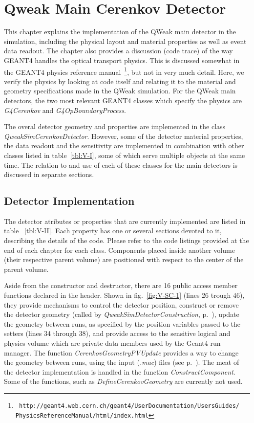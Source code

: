 \chapter{Qweak Main Cerenkov Detector}\label{CHP_V}

This chapter explains the implementation of the QWeak main detector in
the simulation, including the physical layout and material properties
as well as event data readout.  The chapter also provides a discussion
(code trace) of the way GEANT4 handles the optical transport
physics. This is discussed somewhat in the GEANT4 physics reference
manual~\cite{tn:GEANT4PRM}\footnote{{\tt
http://geant4.web.cern.ch/geant4/UserDocumentation/UsersGuides/\\PhysicsReferenceManual/html/index.html}},
but not in very much detail. Here, we verify the physics by looking at
code itself and relating it to the material and geometry
specifications made in the QWeak simulation. For the QWeak main
detectors, the two most relevant GEANT4 classes which specify the
physics are {\it G4Cerenkov} and {\it G4OpBoundaryProcess}.

The overal detector geometry and properties are implemented in the
class {\it QweakSimCerenkovDetector}. However, some of the detector
material properties, the data readout and the sensitivity are
implemented in combination with other classes listed in
table~\ref{tbl:V-I}, some of which serve multiple objects at the same
time.  The relation to and use of each of these classes for the main
detectors is discussed in separate sections.

\section{Detector Implementation}

The detector atributes or properties that are currently implemented
are listed in table ~\ref{tbl:V-II}. Each property has one or several
sections devoted to it, describing the details of the code.  Please
refer to the code listings provided at the end of each chapter for
each class. Components placed inside another volume (their respective
parent volume) are positioned with respect to the center of the parent
volume.

Aside from the constructor and destructor, there are 16 public access
member functions declared in the header.  Shown in
fig.~\ref{fig:V-SC-1} (lines 26 trough 46), they provide mechanisms to
control the detector position, construct or remove the detector
geometry (called by {\it QweakSimDetectorConstruction},
p.~\pageref{QweakSimDetectorConstruction}), update the geometry
between runs, as specified by the position variables passed to the
setters (lines 34 through 38), and provide access to the sensitive
logical and physics volume which are private data members used by
the Geant4 run manager. The function {\it CerenkovGeometryPVUpdate} 
provides a way to change the geometry between runs, using the input
({\em *.mac}) files (see p.~\pageref{batchIII}). The meat of the detector
implementation is handled in the function {\it ConstructComponent}.
Some of the functions, such as {\it DefineCerenkovGeometry} are currently
not used. 

